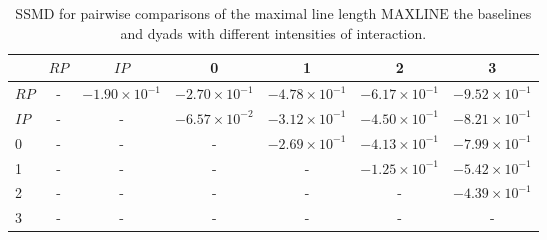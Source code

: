 \begin{table}
\centering
\caption{SSMD for pairwise comparisons of the maximal line length $\text{MAXLINE}$  the baselines and dyads with different intensities of interaction.}
\label{tab:ssmd_maxline}
\begin{tabular}{lcccccc}
\toprule
 & $RP$ & $IP$ & 0 & 1 & 2 & 3 \\
\midrule
$RP$ & - & $-1.90 \times 10^{-1}$ & $-2.70 \times 10^{-1}$ & $-4.78 \times 10^{-1}$ & $-6.17 \times 10^{-1}$ & $-9.52 \times 10^{-1}$ \\
$IP$ & - & - & $-6.57 \times 10^{-2}$ & $-3.12 \times 10^{-1}$ & $-4.50 \times 10^{-1}$ & $-8.21 \times 10^{-1}$ \\
0 & - & - & - & $-2.69 \times 10^{-1}$ & $-4.13 \times 10^{-1}$ & $-7.99 \times 10^{-1}$ \\
1 & - & - & - & - & $-1.25 \times 10^{-1}$ & $-5.42 \times 10^{-1}$ \\
2 & - & - & - & - & - & $-4.39 \times 10^{-1}$ \\
3 & - & - & - & - & - & - \\
\bottomrule
\end{tabular}
\end{table}
